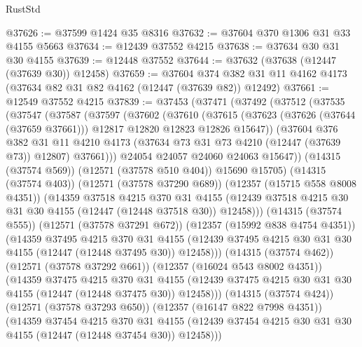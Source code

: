 \begin{lexlean}{RustStd}
\begin{coremodule}
@37626 := @37599 @1424 @35 @8316
@37632 := @37604 @370 @1306 @31 @33 @4155 @5663
@37634 := @12439 @37552 @4215
@37638 := @37634 @30 @31 @30 @4155
@37639 := @12448 @37552
@37644 := @37632 (@37638 (@12447 (@37639 @30)) @12458)
@37659 := @37604
    @374
    @382
    @31
    @11
    @4162
    @4173
    (@37634 @82 @31 @82 @4162 (@12447 (@37639 @82)) @12492)
@37661 := @12549 @37552 @4215
@37839 := @37453
    (@37471
      (@37492
        (@37512
          (@37535
            (@37547
              (@37587
                (@37597
                  (@37602
                    (@37610
                      (@37615
                        (@37623
                          (@37626 (@37644 (@37659 @37661)))
                          @12817
                          @12820
                          @12823
                          @12826
                          @15647))
                      (@37604
                        @376
                        @382
                        @31
                        @11
                        @4210
                        @4173
                        (@37634 @73 @31 @73 @4210 (@12447 (@37639 @73)) @12807)
                        @37661)))
                  @24054
                  @24057
                  @24060
                  @24063
                  @15647))
              (@14315 (@37574 @569))
              (@12571 (@37578 @510 @404))
              @15690
              @15705)
            (@14315 (@37574 @403))
            (@12571 (@37578 @37290 @689))
            (@12357 (@15715 @558 @8008 @4351))
            (@14359
              @37518
              @4215
              @370
              @31
              @4155
              (@12439 @37518 @4215 @30 @31 @30 @4155 (@12447 (@12448 @37518 @30)) @12458)))
          (@14315 (@37574 @555))
          (@12571 (@37578 @37291 @672))
          (@12357 (@15992 @838 @4754 @4351))
          (@14359
            @37495
            @4215
            @370
            @31
            @4155
            (@12439 @37495 @4215 @30 @31 @30 @4155 (@12447 (@12448 @37495 @30)) @12458)))
        (@14315 (@37574 @462))
        (@12571 (@37578 @37292 @661))
        (@12357 (@16024 @543 @8002 @4351))
        (@14359
          @37475
          @4215
          @370
          @31
          @4155
          (@12439 @37475 @4215 @30 @31 @30 @4155 (@12447 (@12448 @37475 @30)) @12458)))
      (@14315 (@37574 @424))
      (@12571 (@37578 @37293 @650))
      (@12357 (@16147 @822 @7998 @4351))
      (@14359
        @37454
        @4215
        @370
        @31
        @4155
        (@12439 @37454 @4215 @30 @31 @30 @4155 (@12447 (@12448 @37454 @30)) @12458)))

\end{coremodule}
\end{lexlean}
